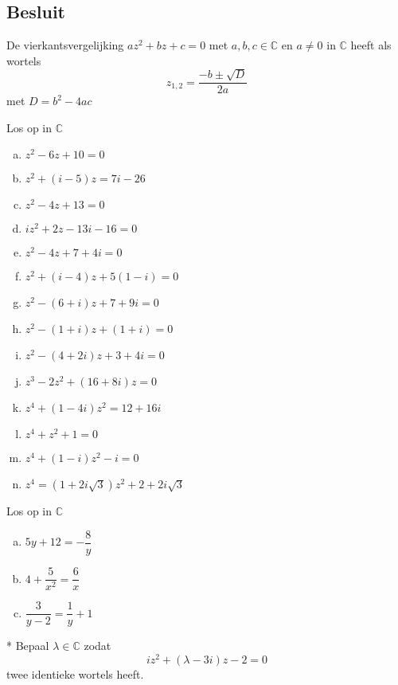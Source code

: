 \documentclass[12pt,twoside,a4paper]{article}
\begin{document}
\subsection{Besluit}

\begin{mdframed}
De vierkantsvergelijking $az^2+bz+c=0$ met $a,b,c\in\mathbb{C}$ en $a\neq 0$ in $\mathbb{C}$ heeft als wortels
$$ z_{1,2}=\dfrac{-b\pm\sqrt{D}}{2a}$$
met $D=b^2-4ac$
\end{mdframed}

\begin{oefening}
  Los op in $\mathbb{C}$
  \begin{multicols}{2}
    \begin{enumerate}[(a)]
      \itemsep 1em
    \item $z^2-6z+10=0$
    \item $z^2+(i-5)z=7i-26$
    \item $z^2-4z+13=0$
    \item $iz^2+2z-13i-16=0$
    \item $z^2-4z+7+4i=0$
    \item $z^2+(i-4)z+5(1-i)=0$
    \item $z^2-(6+i)z+7+9i=0$
    \item $z^2-(1+i)z+(1+i)=0$
    \item $z^2-(4+2i)z+3+4i=0$
    \item $z^3-2z^2+(16+8i)z=0$
    \item $z^4+(1-4i)z^2=12+16i$
    \item $z^4+z^2+1=0$
    \item $z^4+(1-i)z^2-i=0$
    \item $z^4=(1+2i\sqrt{3})z^2+2+2i\sqrt{3}$
    \end{enumerate}
  \end{multicols}
\end{oefening}

\begin{oefening}
Los op in $\mathbb{C}$
  \begin{enumerate}[(a)]
    \itemsep 1em
  \item $5y+12=-\dfrac{8}{y}$
  \item $4+\dfrac{5}{x^2}=\dfrac{6}{x}$
  \item $\dfrac{3}{y-2}=\dfrac{1}{y}+1$
  \end{enumerate}
\end{oefening}

\pagebreak
\begin{oefening}*
  Bepaal $\lambda\in\mathbb{C}$ zodat
  \[iz^2+(\lambda-3i)z-2=0\]
  twee identieke wortels heeft.
\end{oefening}
\end{document}

